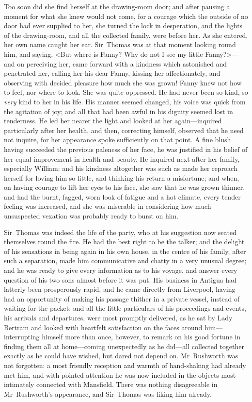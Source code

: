Too soon did she find herself at the drawing-room door; and after pausing a moment for what she knew would not come, for a courage which the outside of no door had ever supplied to her, she turned the lock in desperation, and the lights of the drawing-room, and all the collected family, were before her. As she entered, her own name caught her ear. Sir~Thomas was at that moment looking round him, and saying, <But where is Fanny? Why do not I see my little Fanny?>—and on perceiving her, came forward with a kindness which astonished and penetrated her, calling her his dear Fanny, kissing her affectionately, and observing with decided pleasure how much she was grown! Fanny knew not how to feel, nor where to look. She was quite oppressed. He had never been so kind, so \textit{very}  kind to her in his life. His manner seemed changed, his voice was quick from the agitation of joy; and all that had been awful in his dignity seemed lost in tenderness. He led her nearer the light and looked at her again—inquired particularly after her health, and then, correcting himself, observed that he need not inquire, for her appearance spoke sufficiently on that point. A fine blush having succeeded the previous paleness of her face, he was justified in his belief of her equal improvement in health and beauty. He inquired next after her family, especially William: and his kindness altogether was such as made her reproach herself for loving him so little, and thinking his return a misfortune; and when, on having courage to lift her eyes to his face, she saw that he was grown thinner, and had the burnt, fagged, worn look of fatigue and a hot climate, every tender feeling was increased, and she was miserable in considering how much unsuspected vexation was probably ready to burst on him.

Sir~Thomas was indeed the life of the party, who at his suggestion now seated themselves round the fire. He had the best right to be the talker; and the delight of his sensations in being again in his own house, in the centre of his family, after such a separation, made him communicative and chatty in a very unusual degree; and he was ready to give every information as to his voyage, and answer every question of his two sons almost before it was put. His business in Antigua had latterly been prosperously rapid, and he came directly from Liverpool, having had an opportunity of making his passage thither in a private vessel, instead of waiting for the packet; and all the little particulars of his proceedings and events, his arrivals and departures, were most promptly delivered, as he sat by Lady Bertram and looked with heartfelt satisfaction on the faces around him—interrupting himself more than once, however, to remark on his good fortune in finding them all at home—coming unexpectedly as he did—all collected together exactly as he could have wished, but dared not depend on. Mr~Rushworth was not forgotten: a most friendly reception and warmth of hand-shaking had already met him, and with pointed attention he was now included in the objects most intimately connected with Mansfield. There was nothing disagreeable in Mr~Rushworth's appearance, and Sir~Thomas was liking him already.

